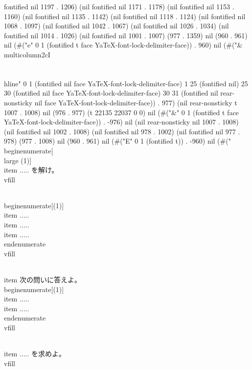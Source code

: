 {fontified nil 1197 . 1206) (nil fontified nil 1171 . 1178) (nil fontified nil 1153 . 1160) (nil fontified nil 1135 . 1142) (nil fontified nil 1118 . 1124) (nil fontified nil 1068 . 1097) (nil fontified nil 1042 . 1067) (nil fontified nil 1026 . 1034) (nil fontified nil 1014 . 1026) (nil fontified nil 1001 . 1007) (977 . 1359) nil (960 . 961) nil (#("e" 0 1 (fontified t face YaTeX-font-lock-delimiter-face)) . 960) nil (#("&\\multicolumn{2}{cI}{}\\\\ \\hline" 0 1 (fontified nil face YaTeX-font-lock-delimiter-face) 1 25 (fontified nil) 25 30 (fontified nil face YaTeX-font-lock-delimiter-face) 30 31 (fontified nil rear-nonsticky nil face YaTeX-font-lock-delimiter-face)) . 977) (nil rear-nonsticky t 1007 . 1008) nil (976 . 977) (t 22135 22037 0 0) nil (#("&" 0 1 (fontified t face YaTeX-font-lock-delimiter-face)) . -976) nil (nil rear-nonsticky nil 1007 . 1008) (nil fontified nil 1002 . 1008) (nil fontified nil 978 . 1002) (nil fontified nil 977 . 978) (977 . 1008) nil (960 . 961) nil (#("E" 0 1 (fontified t)) . -960) nil (#("\\begin{enumerate}[\\large (1)]
  \\item ..... を解け。
\\vfill

    \\begin{enumerate}[(1)]
      \\item .....
      \\item .....
      \\item .....
    \\end{enumerate}
\\vfill

  \\item 次の問いに答えよ。
    \\begin{enumerate}[(1)]
      \\item .....
      \\item .....
    \\end{enumerate}
\\vfill

  \\item ..... を求めよ。
\\vfill

}

